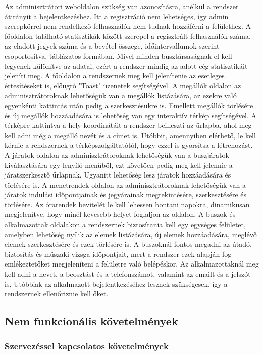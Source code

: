 Az adminisztrátori weboldalon szükség van azonosításra, anélkül a rendszer átirányít a bejelentkezéshez. Itt a regisztráció nem lehetséges, így admin szerepkörrel nem rendelkező felhasználók nem tudnak hozzáférni a felülethez. A főoldalon található statisztikák között szerepel a regisztrált felhasználók száma, az eladott jegyek száma és a bevétel összege, időintervallumok szerint csoportosítva, táblázatos formában. Mivel minden busztársaságnak el kell legyenek különítve az adatai, ezért a rendszer mindig az adott cég statisztikáit jeleníti meg. A főoldalon a rendszernek meg kell jelenítenie az esetleges értesítéseket is, előugró "Toast" üzenetek segítségével. A megállók oldalon az adminisztrátoroknak lehetőségük van a megállók listázására, az ezekre való egyenkénti kattintás után pedig a szerkesztésükre is. Emellett megállók törlésére és új megállók hozzáadására is lehetőség van egy interaktív térkép segítségével. A térképre kattintva a hely koordinátáit a rendszer beilleszti az űrlapba, ahol meg kell adni még a megálló nevét és a címet is. Utóbbit, amennyiben elérhető, le kell kérnie a rendszernek a térképszolgáltatótól, hogy ezzel is gyorsítsa a létrehozást. A járatok oldalon az adminisztrátoroknak lehetőségük van a buszjáratok kiválasztására egy lenyíló menüből, ezt követően pedig meg kell jelennie a járatszerkesztő űrlapnak. Ugyanitt lehetőség lesz járatok hozzáadására és törlésére is. A menetrendek oldalon az adminisztrátoroknak lehetőségük van a járatok indulási időpontjainak és jegyárainak megtekintésére, szerkesztésére és törlésére. Az órarendek bevitelét le kell lehessen bontani napokra, dinamikusan megjelenítve, hogy minél kevesebb helyet foglaljon az oldalon. A buszok és alkalmazottak oldalakon a rendszernek biztosítania kell egy egységes felületet, amelyben lehetőség nyílik az elemek listázására, új elemek hozzáadására, meglévő elemek szerkesztésére és ezek törlésére is. A buszoknál fontos megadni az útadó, biztosítás és műszaki vizsga időpontjait, mert a rendszer ezek alapján fog emlékeztetőket megjeleníteni a felületre való belépéskor. Az alkalmazottaknál meg kell adni a nevet, a beosztást és a telefonszámot, valamint az emailt és a jelszót is. Utóbbiak az alkalmazott bejelentkezéséhez lesznek szükségesek, így a rendszernek ellenőriznie kell őket.

\subsection{Nem funkcionális követelmények}
\subsubsection{Szervezéssel kapcsolatos követelmények}

